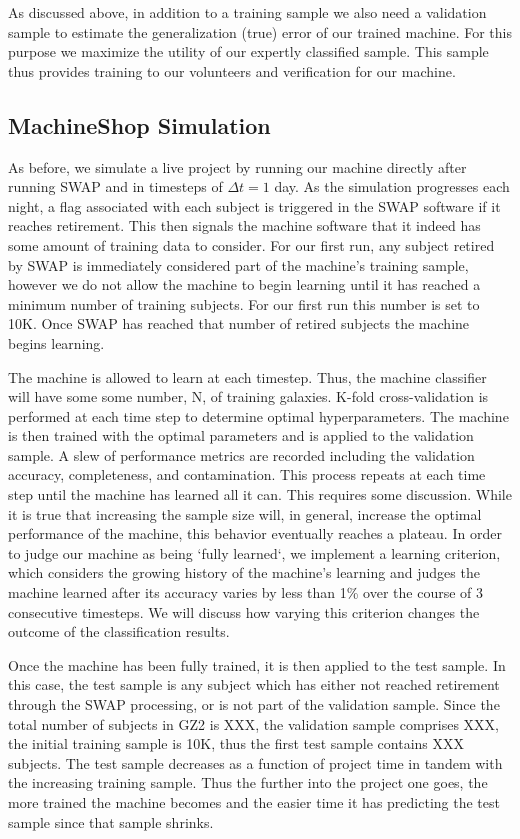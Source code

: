 \documentclass[twocolumn]{aastex6}
\begin{document}
As discussed above, in addition to a training sample we also need a validation 
sample to estimate the generalization (true) error of our trained machine. For 
this purpose we maximize the utility of our expertly classified sample. This sample
thus provides training to our volunteers and verification for our machine. 

\subsection{MachineShop Simulation}

As before, we simulate a live project by running our machine directly after
running SWAP and in timesteps of $\Delta t = 1$ day. 
As the simulation progresses each night, a flag associated with each subject is 
triggered in the SWAP software if it reaches retirement. This then signals the 
machine software that it indeed has some amount of training data to consider. 
For our first run, any subject retired by SWAP is immediately considered part of
the machine's training sample, however we do not allow the machine to begin 
learning until it has reached a minimum number of training subjects. For our first
run this number is set to 10K. Once SWAP has reached that number of retired subjects
the machine begins learning. 

The machine is allowed to learn at each timestep. Thus, the machine classifier will 
have some some number, N, of training galaxies. K-fold cross-validation is performed
at each time step to determine optimal hyperparameters. The machine is then trained 
with the optimal parameters and is applied to the validation sample. 
A slew of performance metrics are recorded including the validation accuracy, 
completeness, and contamination. This process repeats at each time step until 
the machine has learned all it can. This requires some discussion.  While it is
true that increasing the sample size will, in general, increase the optimal performance 
of the machine, this behavior eventually reaches a plateau. In order to judge our 
machine as being `fully learned`, we  implement a learning criterion, which 
considers the growing history of the machine's learning and judges the machine
learned after its accuracy varies by less than 1\% over the course of 3 consecutive
timesteps. We will discuss how varying this criterion changes the outcome of the 
classification results. 

Once the machine has been fully trained, it is then applied to the test sample. 
In this case, the test sample is any subject which has either not reached retirement
through the SWAP processing, or is not part of the validation sample. Since the 
total number of subjects in GZ2 is XXX, the validation sample comprises XXX, 
the initial training sample is 10K, thus the first test sample contains XXX subjects. 
The test sample decreases as a function of project time in tandem with the increasing
training sample. Thus the further into the project one goes, the more trained the 
machine becomes and the easier time it has predicting the test sample since that
sample shrinks. 
\end{document}

